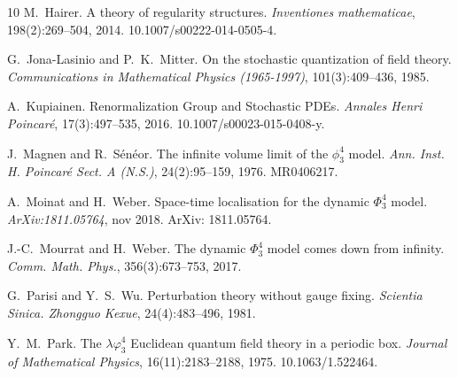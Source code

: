 \documentclass[11pt]{article}
\newcommand{\tmtextit}[1]{{\itshape{#1}}}
\begin{document}
\begin{thebibliography}{10}
  M.~Hairer. {\newblock}A theory of regularity
  structures. {\newblock}\tmtextit{Inventiones mathematicae}, 198(2):269--504,
  2014.
  {\newblock}\href{Https://doi.org/10.1007/s00222-014-0505-4}{}10.1007/s00222-014-0505-4.{\newblock}
  
  G.~Jona-Lasinio  and 
  P.~K.~Mitter. {\newblock}On the stochastic quantization of field theory.
  {\newblock}\tmtextit{Communications in Mathematical Physics (1965-1997)},
  101(3):409--436, 1985.{\newblock}
  
  A.~Kupiainen.
  {\newblock}Renormalization Group and Stochastic PDEs.
  {\newblock}\tmtextit{Annales Henri Poincar{\'e}}, 17(3):497--535, 2016.
  {\newblock}\href{Https://doi.org/10.1007/s00023-015-0408-y}{}10.1007/s00023-015-0408-y.{\newblock}
  
  J.~Magnen  and  R.~S{\'e}n{\'e}or.
  {\newblock}The infinite volume limit of the $\phi^4_3$ model.
  {\newblock}\tmtextit{Ann. Inst. H. Poincar{\'e} Sect. A (N.S.)},
  24(2):95--159, 1976.
  {\newblock}\href{Https://mathscinet.ams.org/mathscinet-getitem?mr=0406217}{}MR0406217.{\newblock}
  
  A.~Moinat  and  H.~Weber.
  {\newblock}Space-time localisation for the dynamic $\Phi^4_3$ model.
  {\newblock}\tmtextit{ArXiv:1811.05764}, nov 2018. {\newblock}ArXiv:
  1811.05764.{\newblock}
  
  J.-C.~Mourrat  and  H.~Weber. {\newblock}The dynamic
  $\Phi^4_3$ model comes down from infinity. {\newblock}\tmtextit{Comm. Math.
  Phys.}, 356(3):673--753, 2017.{\newblock}
  
  G.~Parisi  and  Y.~S.~Wu.
  {\newblock}Perturbation theory without gauge fixing.
  {\newblock}\tmtextit{Scientia Sinica. Zhongguo Kexue}, 24(4):483--496,
  1981.{\newblock}
  
  Y.~M.~Park. {\newblock}The $\lambda
  \varphi^4_3$ Euclidean quantum field theory in a periodic box.
  {\newblock}\tmtextit{Journal of Mathematical Physics}, 16(11):2183--2188,
  1975.
  {\newblock}\href{Https://doi.org/10.1063/1.522464}{}10.1063/1.522464.{\newblock}
\end{thebibliography}

\

\
\end{document}
